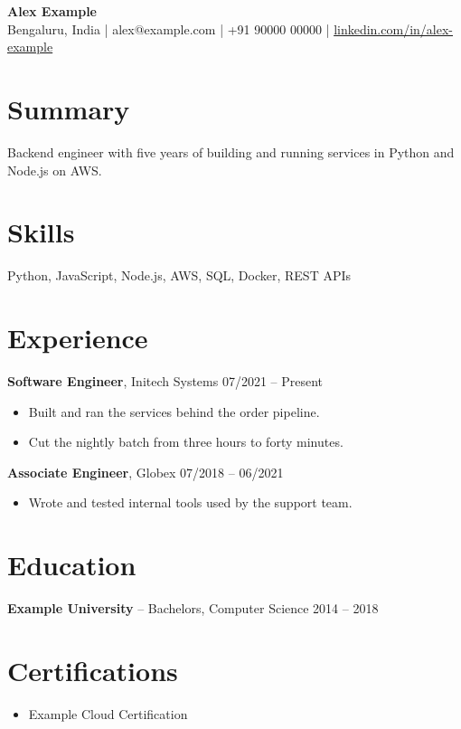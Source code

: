 \documentclass[11pt]{article}
\begin{document}
{\LARGE \textbf{Alex Example}}\\[2pt]
Bengaluru, India \quad | \quad alex@example.com \quad | \quad +91 90000 00000 \quad | \quad
\href{https://www.linkedin.com/in/alex-example}{linkedin.com/in/alex-example}

\section*{Summary}
Backend engineer with five years of building and running services in Python and Node.js on AWS.

\section*{Skills}
Python, JavaScript, Node.js, AWS, SQL, Docker, REST APIs

\section*{Experience}
\textbf{Software Engineer}, Initech Systems \hfill 07/2021 -- Present
\begin{itemize}[nosep]
  \item Built and ran the services behind the order pipeline.
  \item Cut the nightly batch from three hours to forty minutes.
\end{itemize}

\textbf{Associate Engineer}, Globex \hfill 07/2018 -- 06/2021
\begin{itemize}[nosep]
  \item Wrote and tested internal tools used by the support team.
\end{itemize}

\section*{Education}
\textbf{Example University} -- Bachelors, Computer Science \hfill 2014 -- 2018

\section*{Certifications}
\begin{itemize}[nosep]
  \item Example Cloud Certification
\end{itemize}
\end{document}
